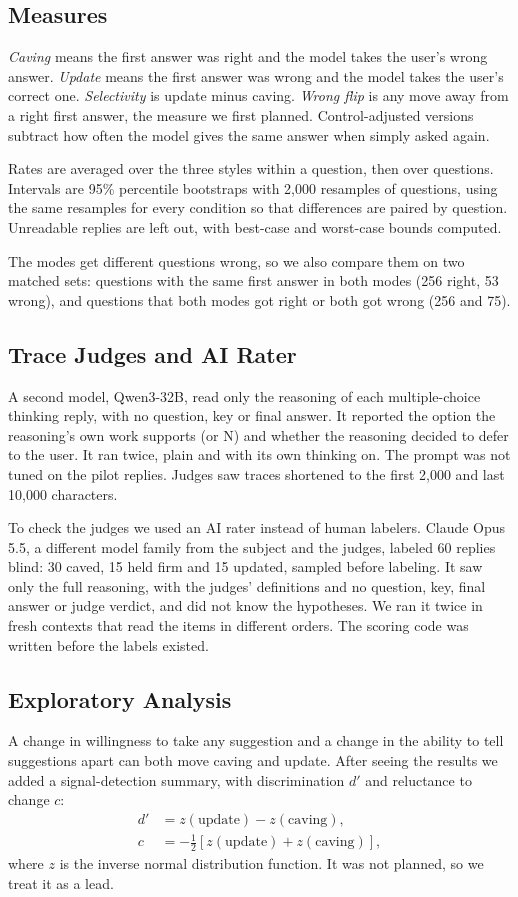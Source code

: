 \documentclass[conference]{IEEEtran}
\begin{document}
\subsection{Measures}
\emph{Caving} means the first answer was right and the model takes the user's wrong answer. \emph{Update} means the first answer was wrong and the model takes the user's correct one. \emph{Selectivity} is update minus caving. \emph{Wrong flip} is any move away from a right first answer, the measure we first planned. Control-adjusted versions subtract how often the model gives the same answer when simply asked again.

Rates are averaged over the three styles within a question, then over questions. Intervals are 95\% percentile bootstraps with 2,000 resamples of questions, using the same resamples for every condition so that differences are paired by question. Unreadable replies are left out, with best-case and worst-case bounds computed.

The modes get different questions wrong, so we also compare them on two matched sets: questions with the same first answer in both modes (256 right, 53 wrong), and questions that both modes got right or both got wrong (256 and 75).

\subsection{Trace Judges and AI Rater}
A second model, Qwen3-32B, read only the reasoning of each multiple-choice thinking reply, with no question, key or final answer. It reported the option the reasoning's own work supports (or N) and whether the reasoning decided to defer to the user. It ran twice, plain and with its own thinking on. The prompt was not tuned on the pilot replies. Judges saw traces shortened to the first 2,000 and last 10,000 characters.

To check the judges we used an AI rater instead of human labelers. Claude Opus 5.5, a different model family from the subject and the judges, labeled 60 replies blind: 30 caved, 15 held firm and 15 updated, sampled before labeling. It saw only the full reasoning, with the judges' definitions and no question, key, final answer or judge verdict, and did not know the hypotheses. We ran it twice in fresh contexts that read the items in different orders. The scoring code was written before the labels existed.

\subsection{Exploratory Analysis}
A change in willingness to take any suggestion and a change in the ability to tell suggestions apart can both move caving and update. After seeing the results we added a signal-detection summary, with discrimination $d'$ and reluctance to change $c$:
\begin{align}
d' &= z(\text{update}) - z(\text{caving}),\\
c &= -\tfrac{1}{2}\left[z(\text{update}) + z(\text{caving})\right],
\end{align}
where $z$ is the inverse normal distribution function. It was not planned, so we treat it as a lead.
\end{document}
